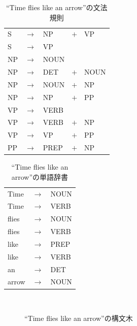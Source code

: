 \documentclass[uplatex, dvipdfmx, a4paper, twocolumn]{jsarticle}
\begin{document}
    \begin{table}[htb]
      \centering
      \caption{``Time flies like an arrow''の文法規則}
      \label{tab:syntax_flies}
      \begin{tabular}{l c l c l} \hline
        S & $\to$ & NP & $+$ & VP \\
        S & $\to$ & VP & & \\
        NP & $\to$ & NOUN & & \\
        NP & $\to$ & DET & $+$ & NOUN \\
        NP & $\to$ & NOUN & $+$ & NP \\
        NP & $\to$ & NP & $+$ & PP \\
        VP & $\to$ & VERB & & \\
        VP & $\to$ & VERB & $+$ & NP \\
        VP & $\to$ & VP & $+$ & PP \\
        PP & $\to$ & PREP & $+$ & NP \\ \hline
      \end{tabular}
    \end{table}
    \begin{table}[htb]
      \centering
      \caption{``Time flies like an arrow''の単語辞書}
      \label{tab:dict_flies}
      \begin{tabular}{l c l} \hline
        Time & $\to$ & NOUN \\
        Time & $\to$ & VERB \\
        flies & $\to$ & NOUN \\
        flies & $\to$ & VERB \\
        like & $\to$ & PREP \\
        like & $\to$ & VERB \\
        an & $\to$ & DET \\
        arrow & $\to$ & NOUN \\ \hline
      \end{tabular}
    \end{table}
    \begin{figure}[htpb]
      \centering
      \subfloat[光陰矢のごとし．]{
        \label{fig:tree_flies_1}
          
      }
       \\
      \caption{``Time flies like an arrow''の構文木}
      \label{fig:tree_flies}
    \end{figure}
\end{document}

